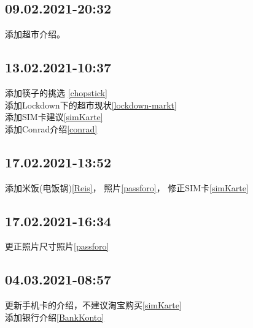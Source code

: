 \documentclass[doku	]{subfiles}
\begin{document}
	
	\subsection{09.02.2021-20:32} 添加超市介绍。
	\subsection{13.02.2021-10:37} 添加筷子的挑选 \ref{chopstick}\\
								  添加Lockdown下的超市现状\ref{lockdown-markt}\\
								  添加SIM卡建议\ref{simKarte}\\
								  添加Conrad介绍\ref{conrad}\\
								  
	\subsection{17.02.2021-13:52} 添加米饭(电饭锅)\ref{Reis}， 照片\ref{passforo}， 修正SIM卡\ref{simKarte}
	\subsection{17.02.2021-16:34} 更正照片尺寸照片\ref{passforo}
								  
	\subsection{04.03.2021-08:57} 更新手机卡的介绍，不建议淘宝购买\ref{simKarte}\\
	添加银行介绍\ref{BankKonto}
\end{document}
